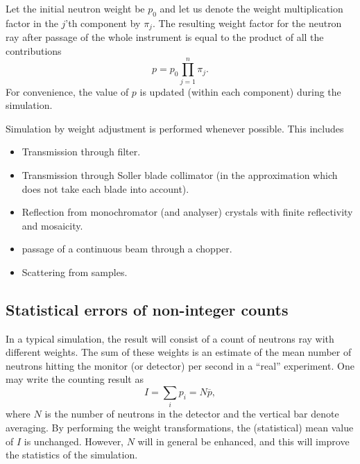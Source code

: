 Let the initial neutron weight be $p_0$ and let us denote the weight
multiplication factor in the $j$'th component by $\pi_j$.  The resulting
weight factor for the neutron ray after passage of the whole instrument is
equal to the product of all the contributions
\begin{equation}
\label{e:probprod}
p = p_0 \prod_{j=1}^n \pi_j .
\end{equation}
For convenience, the value of $p$ is updated (within each component) 
during the simulation.

Simulation by weight adjustment is performed
whenever possible. This includes
\begin{itemize}
\item Transmission through filter.
\item Transmission through Soller blade collimator
 (in the approximation
 which does not take each blade into account).
\item Reflection from monochromator (and analyser) crystals
 with finite reflectivity and mosaicity.
\item passage of a continuous beam through a chopper.
\item Scattering from samples.
\end{itemize}

\subsection{Statistical errors of non-integer counts}
\label{s:staterror}

In a typical simulation, the result will consist of a
count of neutrons ray with different weights. The
sum of these weights is an estimate of the mean number of neutrons 
hitting the monitor (or detector) per second in a ``real'' experiment.
One may write the counting result as
\begin{equation}
\label{psum}
I = \sum_i p_i = N \overline{p} ,
\end{equation}
where $N$ is the number of neutrons in the detector and the vertical bar denote
averaging.
By performing the weight transformations, the (statistical)
mean value of $I$ is unchanged.
However, $N$ will in general be enhanced,
and this will improve the statistics of the simulation.

